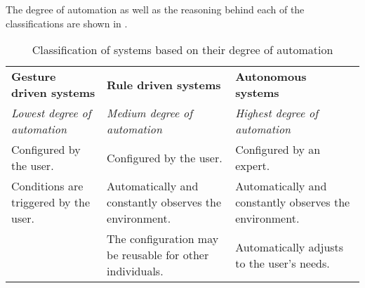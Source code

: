 The degree of automation as well as the reasoning behind each of the classifications are shown in .

\begin{table}[h]
    \centering
    \begin{tabularx}{\textwidth}{XXX}
    \textbf{Gesture driven systems}       & \textbf{Rule driven systems}                             & \textbf{Autonomous systems} \\
    \textit{Lowest degree of automation}  & \textit{Medium degree of automation}                     & \textit{Highest degree of automation}\\
    Configured by the user.               & Configured by the user.                                  & Configured by an expert.\\
    Conditions are triggered by the user. & Automatically and constantly observes the environment.   & Automatically and constantly observes the environment.\\
    ~                                     & The configuration may be reusable for other individuals. & Automatically adjusts to the user's needs.\\
    \end{tabularx}
    \caption{Classification of systems based on their degree of automation}
    \label{tbl:system-categories}
\end{table}

